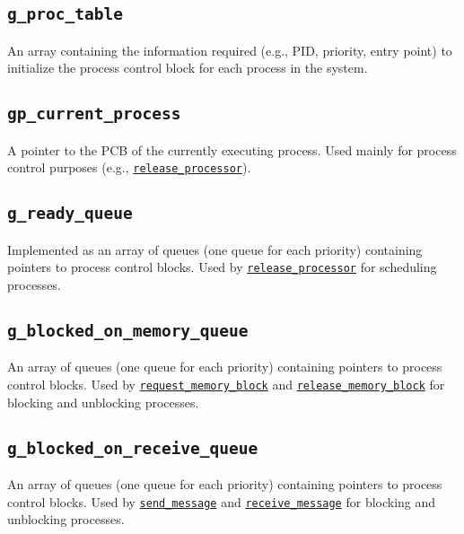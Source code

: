 \documentclass[12pt]{report}
\begin{document}
\subsection{\texttt{g_proc_table}}

An array containing the information required (e.g., PID, priority, entry point) to initialize the process control block for each process in the system.

\subsection{\texttt{gp_current_process}}

A pointer to the PCB of the currently executing process. Used mainly for process control purposes (e.g., \hyperref[alg:releasingtheprocessor]{\texttt{release_processor}}).

\subsection{\texttt{g_ready_queue}}

Implemented as an array of queues (one queue for each priority) containing pointers to process control blocks. Used by \hyperref[alg:releasingtheprocessor]{\texttt{release_processor}} for scheduling processes.


\subsection{\texttt{g_blocked_on_memory_queue}}

An array of queues (one queue for each priority) containing pointers to process control blocks. Used by \hyperref[alg:requestingmemoryblocks]{\texttt{request_memory_block}} and \hyperref[alg:releasingmemoryblocks]{\texttt{release_memory_block}} for blocking and unblocking processes.


\subsection{\texttt{g_blocked_on_receive_queue}}

An array of queues (one queue for each priority) containing pointers to process control blocks. Used by \hyperref[alg:sendingmessages]{\texttt{send_message}} and \hyperref[alg:receivingmessages]{\texttt{receive_message}} for blocking and unblocking processes.
\end{document}

